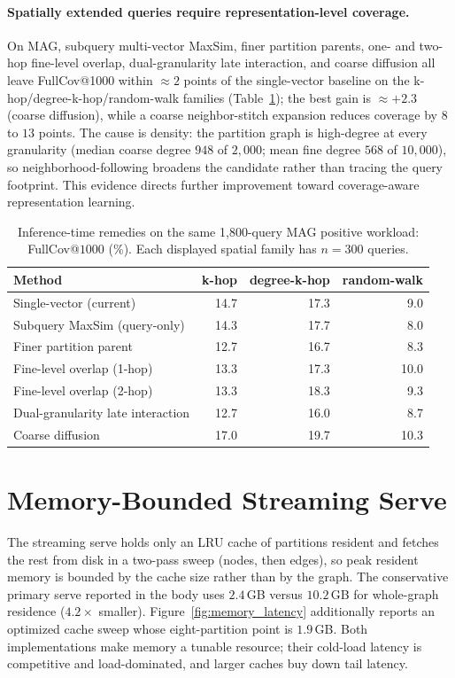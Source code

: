 \documentclass{article}
\begin{document}
\paragraph{Spatially extended queries require representation-level coverage.} On MAG, subquery multi-vector MaxSim, finer partition parents, one- and two-hop fine-level overlap, dual-granularity late interaction, and coarse diffusion all leave FullCov@1000 within ${\approx}2$ points of the single-vector baseline on the k-hop/degree-k-hop/random-walk families (Table~\ref{tab:probes_log}); the best gain is ${\approx}{+}2.3$ (coarse diffusion), while a coarse neighbor-stitch expansion reduces coverage by $8$ to $13$ points. The cause is density: the partition graph is high-degree at every granularity (median coarse degree $948$ of $2{,}000$; mean fine degree $568$ of $10{,}000$), so neighborhood-following broadens the candidate rather than tracing the query footprint. This evidence directs further improvement toward coverage-aware representation learning.

\begin{table}[H]
\centering
\caption{Inference-time remedies on the same 1,800-query MAG positive workload: FullCov@$1000$ (\%). Each displayed spatial family has $n{=}300$ queries.}
\label{tab:probes_log}
\small
\begin{tabular}{lrrr}
\toprule
Method & k-hop & degree-k-hop & random-walk \\
\midrule
Single-vector (current)           & 14.7 & 17.3 & 9.0 \\
Subquery MaxSim (query-only)      & 14.3 & 17.7 & 8.0 \\
Finer partition parent            & 12.7 & 16.7 & 8.3 \\
Fine-level overlap (1-hop)        & 13.3 & 17.3 & 10.0 \\
Fine-level overlap (2-hop)        & 13.3 & 18.3 & 9.3 \\
Dual-granularity late interaction & 12.7 & 16.0 & 8.7 \\
Coarse diffusion                  & 17.0 & 19.7 & 10.3 \\
\bottomrule
\end{tabular}
\end{table}

\section{Memory-Bounded Streaming Serve}
\label{app:memory}

The streaming serve holds only an LRU cache of partitions resident and fetches the rest from disk in a two-pass sweep (nodes, then edges), so peak resident memory is bounded by the cache size rather than by the graph. The conservative primary serve reported in the body uses $2.4$\,GB versus $10.2$\,GB for whole-graph residence ($4.2\times$ smaller). Figure~\ref{fig:memory_latency} additionally reports an optimized cache sweep whose eight-partition point is $1.9$\,GB. Both implementations make memory a tunable resource; their cold-load latency is competitive and load-dominated, and larger caches buy down tail latency.
\end{document}
